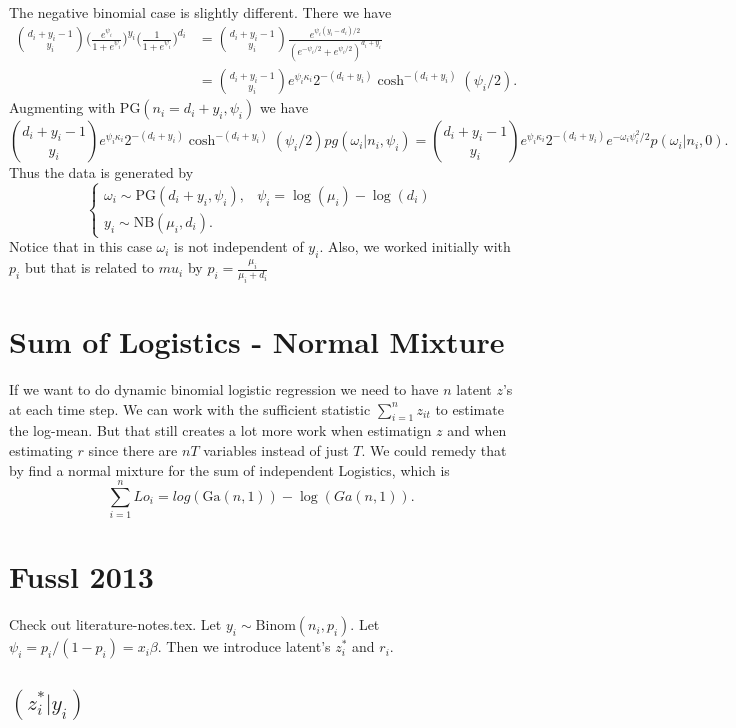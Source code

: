 \documentclass[]{article}
\newcommand{\PG}{\text{PG}}
\newcommand{\Ga}{\text{Ga}}
\newcommand{\NB}{\text{NB}}
\begin{document}
The negative binomial case is slightly different.  There we have
\begin{align*}
{d_i + y_i - 1 \choose y_i} \Big( \frac{e^{\psi_i}}{1 + e^{\psi_i}} \Big)^{y_i}
\Big( \frac{1}{1 + e^{\psi_i}} \Big)^{d_i}
& = 
{d_i + y_i - 1 \choose y_i} \frac{e^{\psi_i (y_i - d_i) /
    2}}{(e^{-\psi_i/2}+e^{\psi_i/2})^{d_i+y_i}} \\
& = {d_i + y_i - 1 \choose y_i} e^{\psi_i \kappa_i} 2^{-(d_i+y_i)}
\cosh^{-(d_i+y_i)}(\psi_i/2). 
\end{align*}
Augmenting with $\PG(n_i = d_i + y_i, \psi_i)$ we have
\[
 {d_i + y_i - 1 \choose y_i} e^{\psi_i \kappa_i} 2^{-(d_i+y_i)}
\cosh^{-(d_i+y_i)}(\psi_i/2) pg(\omega_i | n_i, \psi_i)
= {d_i + y_i - 1 \choose y_i} e^{\psi_i \kappa_i} 2^{-(d_i+y_i)} e^{-\omega_i
\psi_i^2 / 2} p(\omega_i | n_i, 0).
\]
Thus the data is generated by
\[
\begin{cases}
\omega_i \sim \PG(d_i+y_i, \psi_i), & \psi_i = \log(\mu_i) - \log(d_i) \\
y_i \sim \NB(\mu_i, d_i).
\end{cases}
\]
Notice that in this case $\omega_i$ is not independent of $y_i$.  Also, we
worked initially with $p_i$ but that is related to $mu_i$ by $p_i =
\frac{\mu_i}{\mu_i + d_i}$

\section{Sum of Logistics - Normal Mixture}

If we want to do dynamic binomial logistic regression we need to have $n$ latent
$z$'s at each time step.  We can work with the sufficient statistic
$\sum_{i=1}^n z_{it}$ to estimate the log-mean.  But that still creates a lot
more work when estimatign $z$ and when estimating $r$ since there are $nT$
variables instead of just $T$.  We could remedy that by find a normal mixture
for the sum of independent Logistics, which is
\[
\sum_{i=1}^n Lo_i = log(\Ga(n,1)) - \log(Ga(n,1)).
\]

\section{Fussl 2013}

Check out literature-notes.tex.  Let $y_i \sim \text{Binom}(n_i, p_i)$.  Let
$\psi_i = p_i / (1 - p_i) = x_i \beta$.  Then we introduce latent's $z_i^*$ and
$r_i$.

\subsection{$(z_i^*|y_i)$}
\end{document}

